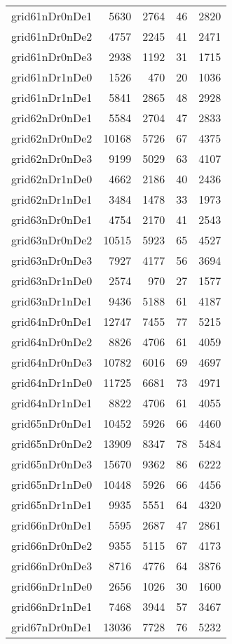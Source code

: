 \begin{longtable}{lrrrr}
grid61nDr0nDe1 & 5630 & 2764 & 46 & 2820 \\
grid61nDr0nDe2 & 4757 & 2245 & 41 & 2471 \\
grid61nDr0nDe3 & 2938 & 1192 & 31 & 1715 \\
grid61nDr1nDe0 & 1526 & 470 & 20 & 1036 \\
grid61nDr1nDe1 & 5841 & 2865 & 48 & 2928 \\
grid62nDr0nDe1 & 5584 & 2704 & 47 & 2833 \\
grid62nDr0nDe2 & 10168 & 5726 & 67 & 4375 \\
grid62nDr0nDe3 & 9199 & 5029 & 63 & 4107 \\
grid62nDr1nDe0 & 4662 & 2186 & 40 & 2436 \\
grid62nDr1nDe1 & 3484 & 1478 & 33 & 1973 \\
grid63nDr0nDe1 & 4754 & 2170 & 41 & 2543 \\
grid63nDr0nDe2 & 10515 & 5923 & 65 & 4527 \\
grid63nDr0nDe3 & 7927 & 4177 & 56 & 3694 \\
grid63nDr1nDe0 & 2574 & 970 & 27 & 1577 \\
grid63nDr1nDe1 & 9436 & 5188 & 61 & 4187 \\
grid64nDr0nDe1 & 12747 & 7455 & 77 & 5215 \\
grid64nDr0nDe2 & 8826 & 4706 & 61 & 4059 \\
grid64nDr0nDe3 & 10782 & 6016 & 69 & 4697 \\
grid64nDr1nDe0 & 11725 & 6681 & 73 & 4971 \\
grid64nDr1nDe1 & 8822 & 4706 & 61 & 4055 \\
grid65nDr0nDe1 & 10452 & 5926 & 66 & 4460 \\
grid65nDr0nDe2 & 13909 & 8347 & 78 & 5484 \\
grid65nDr0nDe3 & 15670 & 9362 & 86 & 6222 \\
grid65nDr1nDe0 & 10448 & 5926 & 66 & 4456 \\
grid65nDr1nDe1 & 9935 & 5551 & 64 & 4320 \\
grid66nDr0nDe1 & 5595 & 2687 & 47 & 2861 \\
grid66nDr0nDe2 & 9355 & 5115 & 67 & 4173 \\
grid66nDr0nDe3 & 8716 & 4776 & 64 & 3876 \\
grid66nDr1nDe0 & 2656 & 1026 & 30 & 1600 \\
grid66nDr1nDe1 & 7468 & 3944 & 57 & 3467 \\
grid67nDr0nDe1 & 13036 & 7728 & 76 & 5232 \\

\end{longtable}
